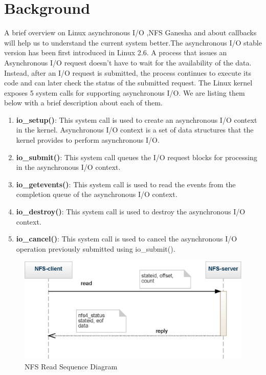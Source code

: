 \section{Background}
\label{bg}

A brief overview on Linux asynchronous I/O ,NFS Ganesha and about callbacks will help us to understand the current system better.The asynchronous I/O stable version has been first introduced in Linux 2.6. A process that issues an Asynchronous I/O request doesn't have to wait for the availability of the data. Instead, after an I/O request is submitted, the process continues to execute its code and can later check the status of the submitted request. The Linux kernel exposes 5 system calls \cite{kernelCode} for supporting asynchronous I/O. We are listing them below with a brief description about each of them.

\begin{enumerate}

\item{\textbf{io\_setup()}: This system call is used to create an asynchronous I/O context in the kernel. Asynchronous I/O context is a set of data structures that the kernel provides to perform asynchronous I/O.}

\item{\textbf{io\_submit()}: This system call queues the I/O request blocks for processing in the asynchronous I/O context.}

\item{\textbf{io\_getevents()}: This system call is used to read the events from the completion queue of the asynchronous I/O context.}

\item{\textbf{io\_destroy()}: This system call is used to destroy the asynchronous I/O context.}

\item{\textbf{io\_cancel()}: This system call is used to cancel the asynchronous I/O operation previously submitted using io\_submit().}

\end{enumerate}

\begin{figure}[htp]
\centering
\includegraphics[scale=0.75]{figures/sequence_read.eps}
\caption{NFS Read Sequence Diagram}
\label{fig:NFSRead}
\end{figure}

